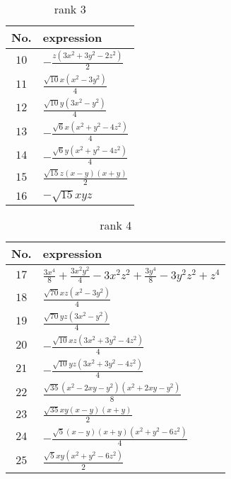 \documentclass[fleqn,8pt,landscape]{jsarticle}
\begin{document}
\begin{table}[ht!]
\begin{center}
\caption{rank 3}
\renewcommand{\arraystretch}{1.3}
\begin{tabular}{cl} \hline \hline
No. & expression \\ \hline
$ 10 $ & $ - \frac{z \left(3 x^{2} + 3 y^{2} - 2 z^{2}\right)}{2} $ \\
$ 11 $ & $ \frac{\sqrt{10} x \left(x^{2} - 3 y^{2}\right)}{4} $ \\
$ 12 $ & $ \frac{\sqrt{10} y \left(3 x^{2} - y^{2}\right)}{4} $ \\
$ 13 $ & $ - \frac{\sqrt{6} x \left(x^{2} + y^{2} - 4 z^{2}\right)}{4} $ \\
$ 14 $ & $ - \frac{\sqrt{6} y \left(x^{2} + y^{2} - 4 z^{2}\right)}{4} $ \\
$ 15 $ & $ \frac{\sqrt{15} z \left(x - y\right) \left(x + y\right)}{2} $ \\
$ 16 $ & $ - \sqrt{15} x y z $ \\
 \hline \hline
\end{tabular}
\end{center}
\end{table}
\begin{table}[ht!]
\begin{center}
\caption{rank 4}
\renewcommand{\arraystretch}{1.3}
\begin{tabular}{cl} \hline \hline
No. & expression \\ \hline
$ 17 $ & $ \frac{3 x^{4}}{8} + \frac{3 x^{2} y^{2}}{4} - 3 x^{2} z^{2} + \frac{3 y^{4}}{8} - 3 y^{2} z^{2} + z^{4} $ \\
$ 18 $ & $ \frac{\sqrt{70} x z \left(x^{2} - 3 y^{2}\right)}{4} $ \\
$ 19 $ & $ \frac{\sqrt{70} y z \left(3 x^{2} - y^{2}\right)}{4} $ \\
$ 20 $ & $ - \frac{\sqrt{10} x z \left(3 x^{2} + 3 y^{2} - 4 z^{2}\right)}{4} $ \\
$ 21 $ & $ - \frac{\sqrt{10} y z \left(3 x^{2} + 3 y^{2} - 4 z^{2}\right)}{4} $ \\
$ 22 $ & $ \frac{\sqrt{35} \left(x^{2} - 2 x y - y^{2}\right) \left(x^{2} + 2 x y - y^{2}\right)}{8} $ \\
$ 23 $ & $ \frac{\sqrt{35} x y \left(x - y\right) \left(x + y\right)}{2} $ \\
$ 24 $ & $ - \frac{\sqrt{5} \left(x - y\right) \left(x + y\right) \left(x^{2} + y^{2} - 6 z^{2}\right)}{4} $ \\
$ 25 $ & $ \frac{\sqrt{5} x y \left(x^{2} + y^{2} - 6 z^{2}\right)}{2} $ \\
 \hline \hline
\end{tabular}
\end{center}
\end{table}
\end{document}

